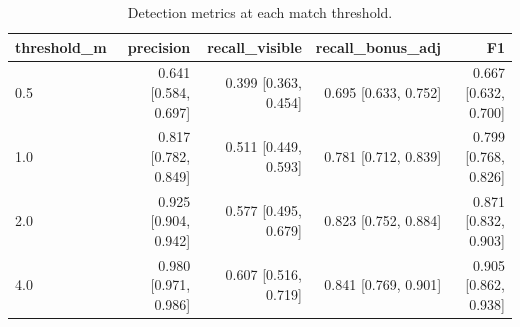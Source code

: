 \begin{table}[t]
\centering
\small
\begin{tabular}{lrrrr}
\toprule
threshold\_m & precision & recall\_visible & recall\_bonus\_adj & F1 \\
\midrule
0.5 & 0.641 [0.584, 0.697] & 0.399 [0.363, 0.454] & 0.695 [0.633, 0.752] & 0.667 [0.632, 0.700] \\
1.0 & 0.817 [0.782, 0.849] & 0.511 [0.449, 0.593] & 0.781 [0.712, 0.839] & 0.799 [0.768, 0.826] \\
2.0 & 0.925 [0.904, 0.942] & 0.577 [0.495, 0.679] & 0.823 [0.752, 0.884] & 0.871 [0.832, 0.903] \\
4.0 & 0.980 [0.971, 0.986] & 0.607 [0.516, 0.719] & 0.841 [0.769, 0.901] & 0.905 [0.862, 0.938] \\
\bottomrule
\end{tabular}
\caption{Detection metrics at each match threshold.}
\label{tab:thresholds}
\end{table}

